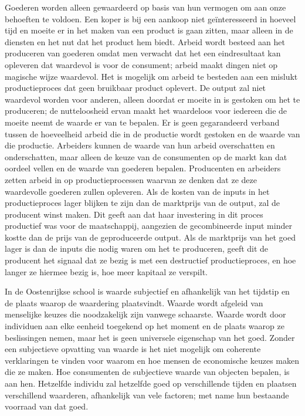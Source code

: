 Goederen worden alleen gewaardeerd op basis van hun vermogen om aan onze behoeften te voldoen. Een koper is bij een aankoop niet geïnteresseerd in hoeveel tijd en moeite er in het maken van een product is gaan zitten, maar alleen in de diensten en het nut dat het product hem biedt. Arbeid wordt besteed aan het produceren van goederen omdat men verwacht dat het een eindresultaat kan opleveren dat waardevol is voor de consument; arbeid maakt dingen niet op magische wijze waardevol. Het is mogelijk om arbeid te besteden aan een mislukt productieproces dat geen bruikbaar product oplevert. De output zal niet waardevol worden voor anderen, alleen doordat er moeite in is gestoken om het te produceren; de nutteloosheid ervan maakt het waardeloos voor iedereen die de moeite neemt de waarde er van te bepalen. Er is geen gegarandeerd verband tussen de hoeveelheid arbeid die in de productie wordt gestoken en de waarde van die productie. Arbeiders kunnen de waarde van hun arbeid overschatten en onderschatten, maar alleen de keuze van de consumenten op de markt kan dat oordeel vellen en de waarde van goederen bepalen. Producenten en arbeiders zetten arbeid in op productieprocessen waarvan ze denken dat ze deze waardevolle goederen zullen opleveren. Als de kosten van de inputs in het productieproces lager blijken te zijn dan de marktprijs van de output, zal de producent winst maken. Dit geeft aan dat haar investering in dit proces productief was voor de maatschappij, aangezien de gecombineerde input minder kostte dan de prijs van de geproduceerde output. Als de marktprijs van het goed lager is dan de inputs die nodig waren om het te produceren, geeft dit de producent het signaal dat ze bezig is met een destructief productieproces, en hoe langer ze hiermee bezig is, hoe meer kapitaal ze verspilt.

In de Oostenrijkse school is waarde subjectief en afhankelijk van het tijdstip en de plaats waarop de waardering plaatsvindt. Waarde wordt afgeleid van menselijke keuzes die noodzakelijk zijn vanwege schaarste. Waarde wordt door individuen aan elke eenheid toegekend op het moment en de plaats waarop ze beslissingen nemen, maar het is geen universele eigenschap van het goed. Zonder een subjectieve opvatting van waarde is het niet mogelijk om coherente verklaringen te vinden voor waarom en hoe mensen de economische keuzes maken die ze maken. Hoe consumenten de subjectieve waarde van objecten bepalen, is aan hen. Hetzelfde individu zal hetzelfde goed op verschillende tijden en plaatsen verschillend waarderen, afhankelijk van vele factoren; met name hun bestaande voorraad van dat goed.

